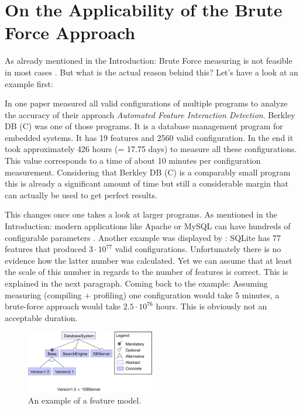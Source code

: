 \section{On the Applicability of the Brute Force Approach}
\label{sec:BruteForce}
As already mentioned in the Introduction: Brute Force measuring is not feasible in most cases \cite{AutomatedFeatureDetectionSiegmund2012}. But what is the actual reason behind this?
Let's have a look at an example first:

In one paper \citet{AutomatedFeatureDetectionSiegmund2012} measured all valid configurations of multiple programs to analyze the accuracy of their approach \textit{Automated Feature Interaction Detection}. Berkley DB (C) was one of those programs. It is a database management program for embedded systems. It has 19 features and 2560 valid configuration. In the end it took approximately 426 hours (= 17.75 days) to measure all these configurations. This value corresponds to a time of about 10 minutes per configuration measurement. Considering that Berkley DB (C) is a comparably small program this is already a significant amount of time but still a considerable margin that can actually be used to get perfect results.

This changes once one takes a look at larger programs. As mentioned in the Introduction: modern applications like Apache or MySQL can have hundreds of configurable parameters \cite{YouveGivenMeTooManyKnobs}. Another example was displayed by \citet{VAMOSConference}: SQLite has 77 features that produced $3 \cdot 10^{77}$ valid configurations. Unfortunately there is no evidence how the latter number was calculated. Yet we can assume that at least the scale of this number in regards to the number of features is correct. This is explained in the next paragraph. Coming back to the example: Assuming measuring (compiling + profiling) one configuration would take 5 minutes, a brute-force approach would take $2.5 \cdot 10^76$ hours. This is obviously not an acceptable duration.

\begin{figure}
	\includegraphics[width = 0.5\textwidth]{presentation/figures/FeatureModel}
	\captionsetup{width=0.95\linewidth}
	\caption{An example of a feature model.}
	\label{fig:FeatureModel}
\end{figure}

